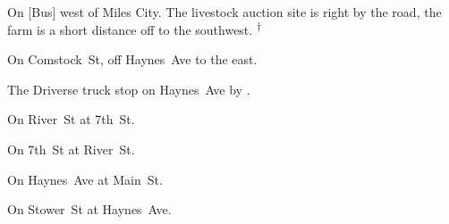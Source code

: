 

\begin{LocationList}

On [Bus] west of Miles City.
The livestock auction site is right by the road, the farm is a short distance off to the southwest.%
\textsuperscript{\scriptsize $\dagger$}

On Comstock~St, off  Haynes~Ave to the east.

The Driverse truck stop on  Haynes~Ave by .

On River~St at  7th~St.

\Location{\GarageHQ \Garage}
On  7th~St at River~St.

On Haynes~Ave at  Main~St.

On Stower~St at  Haynes~Ave.

\end{LocationList}
